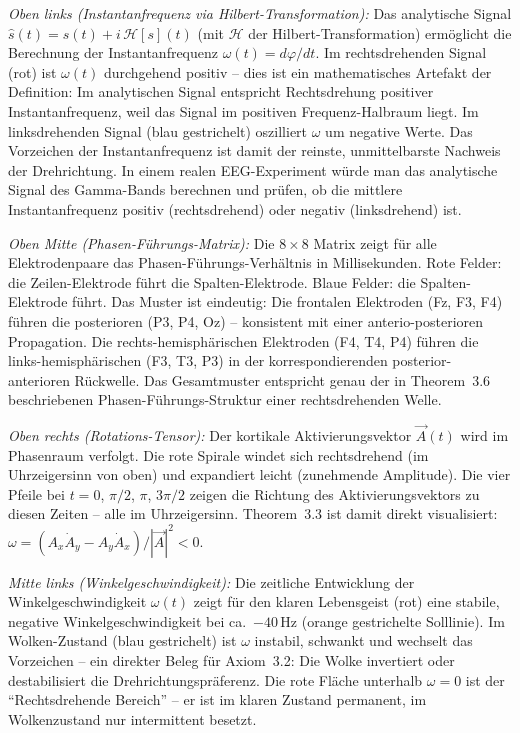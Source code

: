 ﻿\documentclass[12pt,a4paper]{report}
\theoremstyle{plain}
\theoremstyle{definition}
\theoremstyle{remark}
\begin{document}
	\textit{Oben links (Instantanfrequenz via Hilbert-Transformation):}
	Das analytische Signal $\hat{s}(t) = s(t) + i\,\mathcal{H}[s](t)$
	(mit $\mathcal{H}$ der Hilbert-Transformation) ermöglicht die Berechnung
	der Instantanfrequenz $\omega(t) = d\varphi/dt$.
	Im rechtsdrehenden Signal (rot) ist $\omega(t)$ durchgehend positiv --
	dies ist ein mathematisches Artefakt der Definition: Im analytischen
	Signal entspricht Rechtsdrehung positiver Instantanfrequenz,
	weil das Signal im positiven Frequenz-Halbraum liegt.
	Im linksdrehenden Signal (blau gestrichelt) oszilliert $\omega$
	um negative Werte. Das Vorzeichen der Instantanfrequenz ist damit
	der reinste, unmittelbarste Nachweis der Drehrichtung.
	In einem realen EEG-Experiment würde man das analytische Signal
	des Gamma-Bands berechnen und prüfen, ob die mittlere Instantanfrequenz
	positiv (rechtsdrehend) oder negativ (linksdrehend) ist.

	\textit{Oben Mitte (Phasen-Führungs-Matrix):}
	Die $8\times 8$ Matrix zeigt für alle Elektrodenpaare das Phasen-Führungs-Verhältnis
	in Millisekunden. Rote Felder: die Zeilen-Elektrode führt die
	Spalten-Elektrode. Blaue Felder: die Spalten-Elektrode führt.
	Das Muster ist eindeutig: Die frontalen Elektroden (Fz, F3, F4)
	führen die posterioren (P3, P4, Oz) -- konsistent mit einer
	anterio-posterioren Propagation. Die rechts-hemisphärischen Elektroden
	(F4, T4, P4) führen die links-hemisphärischen (F3, T3, P3) in der
	korrespondierenden posterior-anterioren Rückwelle.
	Das Gesamtmuster entspricht genau der in Theorem~3.6 beschriebenen
	Phasen-Führungs-Struktur einer rechtsdrehenden Welle.

	\textit{Oben rechts (Rotations-Tensor):}
	Der kortikale Aktivierungsvektor $\vec{A}(t)$ wird im Phasenraum
	verfolgt. Die rote Spirale windet sich rechtsdrehend (im Uhrzeigersinn
	von oben) und expandiert leicht (zunehmende Amplitude). Die vier
	Pfeile bei $t = 0$, $\pi/2$, $\pi$, $3\pi/2$ zeigen die Richtung
	des Aktivierungsvektors zu diesen Zeiten -- alle im Uhrzeigersinn.
	Theorem~3.3 ist damit direkt visualisiert:
	$\omega = (A_x\dot{A}_y - A_y\dot{A}_x)/|\vec{A}|^2 < 0$.

	\textit{Mitte links (Winkelgeschwindigkeit):}
	Die zeitliche Entwicklung der Winkelgeschwindigkeit $\omega(t)$ zeigt
	für den klaren Lebensgeist (rot) eine stabile, negative Winkelgeschwindigkeit
	bei ca.\ $-40$\,Hz (orange gestrichelte Solllinie).
	Im Wolken-Zustand (blau gestrichelt) ist $\omega$ instabil, schwankt
	und wechselt das Vorzeichen -- ein direkter Beleg für Axiom~3.2:
	Die Wolke invertiert oder destabilisiert die Drehrichtungspräferenz.
	Die rote Fläche unterhalb $\omega = 0$ ist der ``Rechtsdrehende Bereich'' --
	er ist im klaren Zustand permanent, im Wolkenzustand nur intermittent besetzt.
\end{document}
